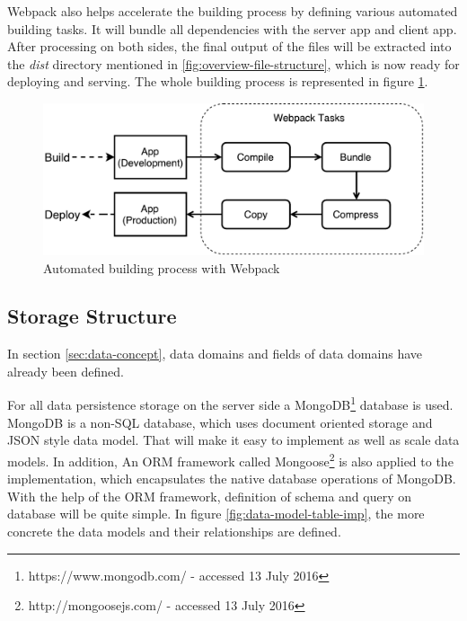 Webpack also helps accelerate the building process by defining various automated building tasks. It will bundle all dependencies with the server app and client app. After processing on both sides, the final output of the files will be extracted into the \textit{dist} directory mentioned in \ref{fig:overview-file-structure}, which is now ready for deploying and serving. The whole building process is represented in figure \ref{fig:automated-building-imp}.

\begin{figure}[!htbp]
  \centering
    \includegraphics[width=1\textwidth]{Figures/imp-automated-building.pdf}
  \caption{Automated building process with Webpack}
  \label{fig:automated-building-imp}
\end{figure}


\subsection{Storage Structure} \label{subsec:storage-structure-imp}
In section \ref{sec:data-concept}, data domains and fields of data domains  have already been defined. 

For all data persistence storage on the server side a MongoDB\footnote{https://www.mongodb.com/ - accessed 13 July 2016} database is used.  MongoDB is a non-SQL database, which uses document oriented storage and JSON style data model\cite{banker2011mongodb}. That will make it easy to implement as well as scale data models. In addition, An \gls{ORM} framework called Mongoose\footnote{http://mongoosejs.com/ - accessed 13 July 2016} is also applied to the implementation, which encapsulates the native database operations of MongoDB\cite{mardan2014boosting}. With the help of the \gls{ORM} framework, definition of schema and query on database will be quite simple. In figure \ref{fig:data-model-table-imp}, the more concrete the data models and their relationships are defined.

